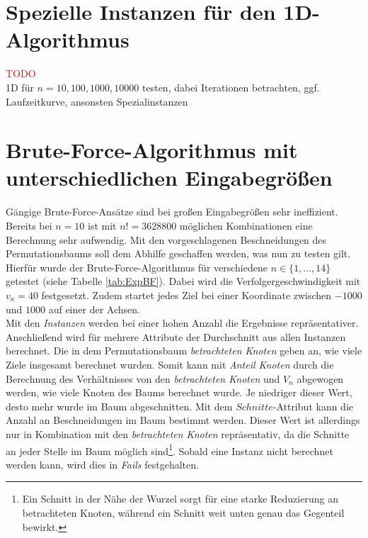 \documentclass[german,version-2019-11]{uzl-thesis}
\begin{document}
\section{Spezielle Instanzen für den 1D-Algorithmus}
\textcolor{red}{TODO}\\
1D für $n=10,100,1000,10000$ testen, dabei Iterationen betrachten, ggf. Laufzeitkurve, ansonsten Spezialinstanzen

\section{Brute-Force-Algorithmus mit unterschiedlichen Eingabegrößen}

Gängige Brute-Force-Ansätze sind bei großen Eingabegrößen sehr ineffizient. Bereits bei $n=10$ ist mit $n!=3628800$ möglichen Kombinationen eine Berechnung sehr aufwendig. Mit den vorgeschlagenen Beschneidungen des Permutationsbaums soll dem Abhilfe geschaffen werden, was nun zu testen gilt. Hierfür wurde der Brute-Force-Algorithmus für verschiedene $n\in\{1,...,14\}$ getestet (siehe Tabelle \ref{tab:ExpBF}). Dabei wird die Verfolgergeschwindigkeit mit $v_{\kappa}=40$ festgesetzt. Zudem startet jedes Ziel bei einer Koordinate zwischen $-1000$ und $1000$ auf einer der Achsen. \\
Mit den \emph{Instanzen} werden bei einer hohen Anzahl die Ergebnisse repräsentativer. Anschließend wird für mehrere Attribute der Durchschnitt aus allen Instanzen berechnet. Die in dem Permutationsbaum \emph{betrachteten Knoten} geben an, wie viele Ziele insgesamt berechnet wurden. Somit kann mit \emph{Anteil Knoten} durch die Berechnung des Verhältnisses von den \emph{betrachteten Knoten} und $V_n$ abgewogen werden, wie viele Knoten des Baums berechnet wurde. Je niedriger dieser Wert, desto mehr wurde im Baum abgeschnitten. Mit dem $Schnitte$-Attribut kann die Anzahl an Beschneidungen im Baum bestimmt werden. Dieser Wert ist allerdings nur in Kombination mit den \emph{betrachteten Knoten} repräsentativ, da die Schnitte an jeder Stelle im Baum möglich sind\footnote{Ein Schnitt in der Nähe der Wurzel sorgt für eine starke Reduzierung an betrachteten Knoten, während ein Schnitt weit unten genau das Gegenteil bewirkt.}. Sobald eine Instanz nicht berechnet werden kann, wird dies in \emph{Fails} festgehalten.
\end{document}
